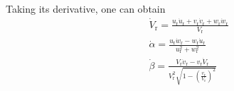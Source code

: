 Taking its derivative, one can obtain
\begin{equation}\label{eq4.49}
\begin{aligned}
& \dot{V}_{\mathrm{r}}=\frac{u_{\mathrm{r}} \dot{u}_{\mathrm{r}}+v_{\mathrm{r}} \dot{v}_{\mathrm{r}}+w_{\mathrm{r}} \dot{w}_{\mathrm{r}}}{V_{\mathrm{r}}} \\
& \dot{\alpha}=\frac{u_{\mathrm{r}} \dot{w}_{\mathrm{r}}-w_{\mathrm{r}} \dot{u}_{\mathrm{r}}}{u_{\mathrm{r}}^2+w_{\mathrm{r}}^2} \\
& \dot{\beta}=\frac{V_{\mathrm{r}} \dot{v}_{\mathrm{r}}-v_{\mathrm{r}} \dot{V}_{\mathrm{r}}}{V_{\mathrm{r}}^2 \sqrt{1-\left(\frac{v_{\mathrm{r}}}{V_{\mathrm{r}}}\right)^2}}
\end{aligned}
\end{equation}

